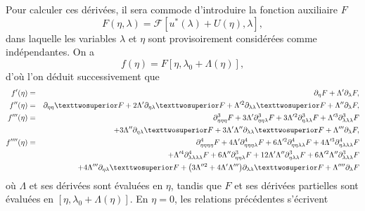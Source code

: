 \documentclass[12pt, final]{amsart}
\begin{document}
Pour calculer ces dérivées, il sera commode d'introduire la fonction auxiliaire
\(F\)
\begin{equation}
  F(\eta , \lambda )=\mathcal{F}[u^*(\lambda )+U(\eta ), \lambda ],
\end{equation}
dans laquelle les variables \(\lambda \) et \(\eta \) sont provisoirement considérées
comme indépendantes. On a
\begin{equation}
  f(\eta )=F[\eta , \lambda _0+\Lambda (\eta )],
\end{equation}
d'où l'on déduit successivement que
\begin{eqnarray}
  \label{eq:20211112162417}
  f'(\eta )&=&\partial _\eta F+\Lambda '\partial _\lambda F,\\
  \label{eq:20211112165810}
  f''(\eta )&=&\partial _{\eta \eta }²F+2\Lambda '\partial _{\eta \lambda }²F+\Lambda '^2\partial _{\lambda \lambda }²F+\Lambda ''\partial _\lambda  F,\\
  \notag
  f'''(\eta )&=&\partial _{\eta \eta \eta }^3F+3\Lambda '\partial _{\eta \eta \lambda }^3F+3\Lambda '^2\partial _{\eta \lambda \lambda }^3F+\Lambda '^3\partial _{\lambda \lambda \lambda }^3F\\
  \label{eq:20211112173223}
       &&+3\Lambda ''\partial _{\eta \lambda }²F+3\Lambda '\Lambda ''\partial _{\lambda \lambda }²F+\Lambda '''\partial _\lambda F,\\
  \notag
  f''''(\eta )&=&\partial _{\eta \eta \eta \eta }^4F+4\Lambda '\partial _{\eta \eta \eta \lambda }^4F+6\Lambda '^2\partial _{\eta \eta \lambda \lambda }^4F+4\Lambda '^3\partial _{\eta \lambda \lambda \lambda }^4F\\
  \notag
       &&+\Lambda '^4\partial _{\lambda \lambda \lambda \lambda }^4F+6\Lambda ''\partial _{\eta \eta \lambda }^3F+12\Lambda '\Lambda ''\partial _{\eta \lambda \lambda }^3F+6\Lambda '^2\Lambda ''\partial _{\lambda \lambda \lambda }^3F\\
       &&+4\Lambda '''\partial _{\eta \lambda }²F+\bigl(3\Lambda ''^2+4\Lambda '\Lambda '''\bigr)\partial _{\lambda \lambda }²F+\Lambda ''''\partial _\lambda F
\end{eqnarray}
où \(\Lambda \) et ses dérivées sont évaluées en \(\eta \), tandis que \(F\) et ses
dérivées partielles sont évaluées en \([\eta , \lambda _0+\Lambda (\eta )]\). En \(\eta =0\), les
relations précédentes s'écrivent
\end{document}
